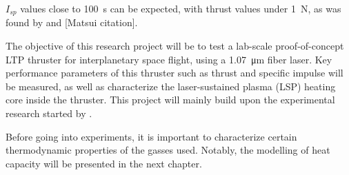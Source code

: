         $I_{sp}$ values close to \qty{100}{s} can be expected, with thrust values under \qty{1}{N}, as was found by \textcite{toyodaThrustPerformanceCW2002} and [Matsui citation].

        The objective of this research project will be to test a lab-scale proof-of-concept LTP thruster for interplanetary space flight, using a \qty{1.07}{μm} fiber laser. Key performance parameters of this thruster such as thrust and specific impulse will be measured, as well as characterize the laser-sustained plasma (LSP) heating core inside the thruster. This project will mainly build upon the experimental research started by \textcite{duplayArgonLaserPlasmaThruster2024a}.
        
        Before going into experiments, it is important to characterize certain thermodynamic properties of the gasses used. Notably, the modelling of heat capacity will be presented in the next chapter.
